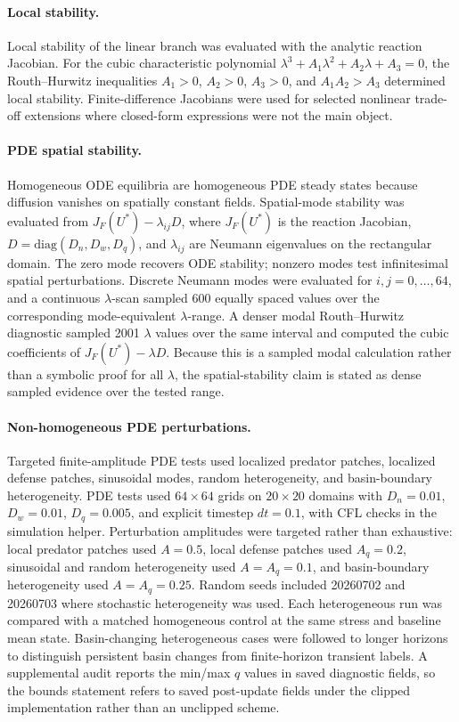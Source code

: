\documentclass[11pt]{article}
\begin{document}
\paragraph{Local stability.}
Local stability of the linear branch was evaluated with the analytic reaction Jacobian. For the cubic characteristic polynomial \(\lambda^3+A_1\lambda^2+A_2\lambda+A_3=0\), the Routh--Hurwitz inequalities \(A_1>0\), \(A_2>0\), \(A_3>0\), and \(A_1A_2>A_3\) determined local stability. Finite-difference Jacobians were used for selected nonlinear trade-off extensions where closed-form expressions were not the main object.

\paragraph{PDE spatial stability.}
Homogeneous ODE equilibria are homogeneous PDE steady states because diffusion vanishes on spatially constant fields. Spatial-mode stability was evaluated from \(J_F(U^*)-\lambda_{ij}D\), where \(J_F(U^*)\) is the reaction Jacobian, \(D=\mathrm{diag}(D_n,D_w,D_q)\), and \(\lambda_{ij}\) are Neumann eigenvalues on the rectangular domain. The zero mode recovers ODE stability; nonzero modes test infinitesimal spatial perturbations. Discrete Neumann modes were evaluated for \(i,j=0,\ldots,64\), and a continuous \(\lambda\)-scan sampled 600 equally spaced values over the corresponding mode-equivalent \(\lambda\)-range. A denser modal Routh--Hurwitz diagnostic sampled 2001 \(\lambda\) values over the same interval and computed the cubic coefficients of \(J_F(U^*)-\lambda D\). Because this is a sampled modal calculation rather than a symbolic proof for all \(\lambda\), the spatial-stability claim is stated as dense sampled evidence over the tested range.

\paragraph{Non-homogeneous PDE perturbations.}
Targeted finite-amplitude PDE tests used localized predator patches, localized defense patches, sinusoidal modes, random heterogeneity, and basin-boundary heterogeneity. PDE tests used \(64\times64\) grids on \(20\times20\) domains with \(D_n=0.01\), \(D_w=0.01\), \(D_q=0.005\), and explicit timestep \(dt=0.1\), with CFL checks in the simulation helper. Perturbation amplitudes were targeted rather than exhaustive: local predator patches used \(A=0.5\), local defense patches used \(A_q=0.2\), sinusoidal and random heterogeneity used \(A=A_q=0.1\), and basin-boundary heterogeneity used \(A=A_q=0.25\). Random seeds included 20260702 and 20260703 where stochastic heterogeneity was used. Each heterogeneous run was compared with a matched homogeneous control at the same stress and baseline mean state. Basin-changing heterogeneous cases were followed to longer horizons to distinguish persistent basin changes from finite-horizon transient labels. A supplemental audit reports the min/max \(q\) values in saved diagnostic fields, so the bounds statement refers to saved post-update fields under the clipped implementation rather than an unclipped scheme.
\end{document}

